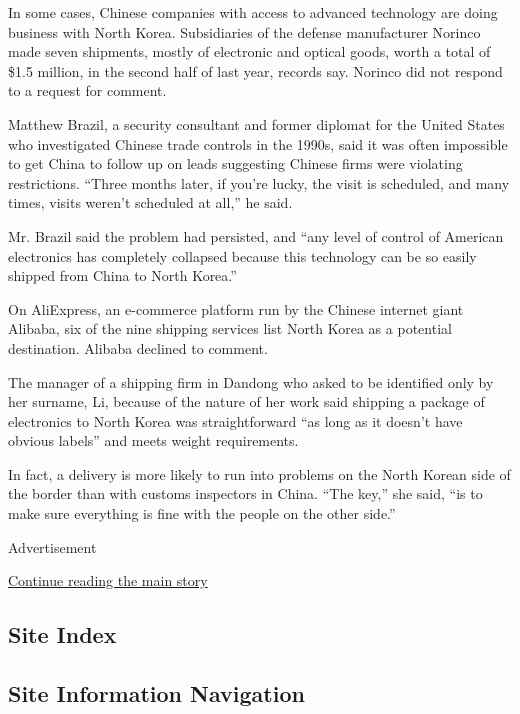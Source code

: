 In some cases, Chinese companies with access to advanced technology are
doing business with North Korea. Subsidiaries of the defense
manufacturer Norinco made seven shipments, mostly of electronic and
optical goods, worth a total of \$1.5 million, in the second half of
last year, records say. Norinco did not respond to a request for
comment.

Matthew Brazil, a security consultant and former diplomat for the United
States who investigated Chinese trade controls in the 1990s, said it was
often impossible to get China to follow up on leads suggesting Chinese
firms were violating restrictions. ``Three months later, if you're
lucky, the visit is scheduled, and many times, visits weren't scheduled
at all,'' he said.

Mr. Brazil said the problem had persisted, and ``any level of control of
American electronics has completely collapsed because this technology
can be so easily shipped from China to North Korea.''

On AliExpress, an e-commerce platform run by the Chinese internet giant
Alibaba, six of the nine shipping services list North Korea as a
potential destination. Alibaba declined to comment.

The manager of a shipping firm in Dandong who asked to be identified
only by her surname, Li, because of the nature of her work said shipping
a package of electronics to North Korea was straightforward ``as long as
it doesn't have obvious labels'' and meets weight requirements.

In fact, a delivery is more likely to run into problems on the North
Korean side of the border than with customs inspectors in China. ``The
key,'' she said, ``is to make sure everything is fine with the people on
the other side.''

Advertisement

\protect\hyperlink{after-bottom}{Continue reading the main story}

\hypertarget{site-index}{%
\subsection{Site Index}\label{site-index}}

\hypertarget{site-information-navigation}{%
\subsection{Site Information
Navigation}\label{site-information-navigation}}

